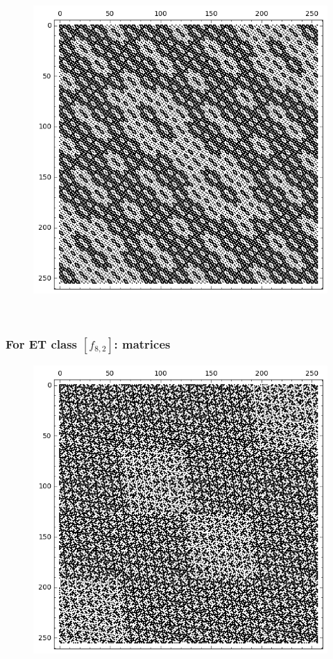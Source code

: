 \documentclass[pdf,sprung,slideColor,nocolorBG]{beamer}
\newenvironment{colortheme}[1]{
\def\ProvidesPackageRCS $##1${\relax}
\renewcommand{\ProcessOptions}{\relax}
\makeatletter

\makeatother
}{}
\begin{document}
\begin{colortheme}{jubata}
\begin{frame}
\begin{figure}
\begin{minipage}{.48\textwidth}
  \includegraphics[width=.9\linewidth]{../matrix_plot/re8_1_bent_cayley_graph_index_matrix.png}
  \label{fig:8_1_bent_cayley_graph_index_matrix}
\end{minipage}
\end{figure}
~
\end{frame}
\begin{frame}
\frametitle{For ET class $[f_{8,2}]$: matrices}
\begin{figure}
\centering
\begin{minipage}{.48\textwidth}
  \centering
  \includegraphics[width=.9\linewidth]{../matrix_plot/re8_2_weight_class_matrix.png}

\end{minipage}
\end{figure}
\end{frame}
\end{colortheme}
\end{document}
